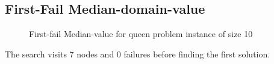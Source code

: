 \documentclass[a4paper, 11pt]{article}
\begin{document}
\subsection{First-Fail Median-domain-value}
\begin{figure}[H]
  \begin{center}
    \caption{First-fail Median-value for queen problem instance of size 10}
    \label{fig:ffmv10}
  \end{center}
\end{figure}
The search visits 7 nodes and 0 failures before finding the first solution.
\end{document}
